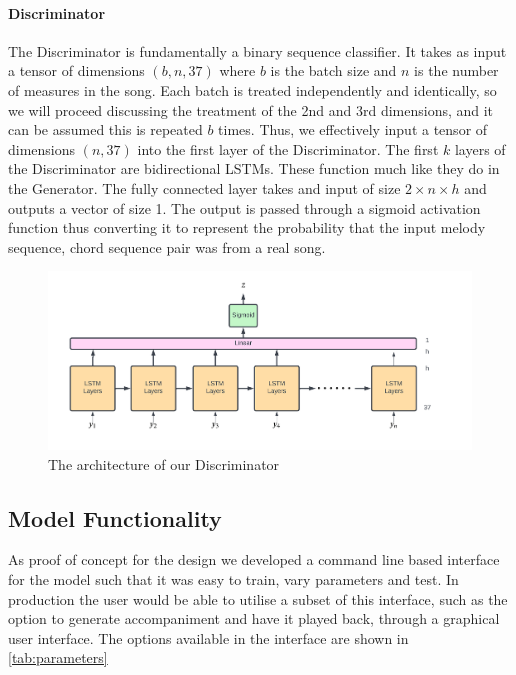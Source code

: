 \paragraph{Discriminator}
The Discriminator is fundamentally a binary sequence classifier.
It takes as input a tensor of dimensions $(b,n,37)$ where $b$ is the batch size and $n$ is the number of measures in the song.
Each batch is treated independently and identically, so we will proceed discussing the treatment of the 2nd and 3rd dimensions, and it can be assumed this is repeated $b$ times.
Thus, we effectively input a tensor of dimensions $(n,37)$ into the first layer of the Discriminator.
The first $k$ layers of the Discriminator are bidirectional LSTMs. 
These function much like they do in the Generator.
The fully connected layer takes and input of size $2 \times n \times h$ and outputs a vector of size 1.
The output is passed through a sigmoid activation function thus converting it to represent the probability that the input melody sequence, chord sequence pair was from a real song.

\begin{figure}
    \centering
    \includegraphics[width=0.8\columnwidth]{Figures/Discriminator}
    \decoRule
    \caption{The architecture of our Discriminator}
    \label{fig:Discriminator}
\end{figure}


\subsection{Model Functionality}

As proof of concept for the design we developed a command line based interface for the model such that it was easy to train, vary parameters and test. 
In production the user would be able to utilise a subset of this interface, such as the option to generate accompaniment and have it played back, through a graphical user interface.
The options available in the interface are shown in \autoref{tab:parameters}

